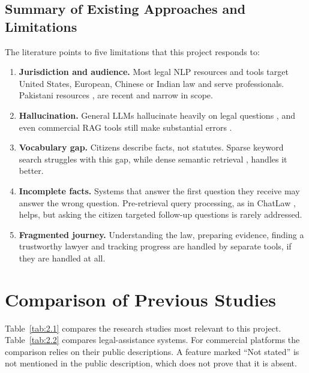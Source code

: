 \subsection{Summary of Existing Approaches and Limitations}

The literature points to five limitations that this project responds to:

\begin{enumerate}
  \item \textbf{Jurisdiction and audience.} Most legal NLP resources and tools target United States, European, Chinese or Indian law and serve professionals. Pakistani resources \cite{r18}, \cite{r19} are recent and narrow in scope.
  \item \textbf{Hallucination.} General LLMs hallucinate heavily on legal questions \cite{r8}, and even commercial RAG tools still make substantial errors \cite{r9}.
  \item \textbf{Vocabulary gap.} Citizens describe facts, not statutes. Sparse keyword search struggles with this gap, while dense semantic retrieval \cite{r12}, \cite{r13} handles it better.
  \item \textbf{Incomplete facts.} Systems that answer the first question they receive may answer the wrong question. Pre-retrieval query processing, as in ChatLaw \cite{r17}, helps, but asking the citizen targeted follow-up questions is rarely addressed.
  \item \textbf{Fragmented journey.} Understanding the law, preparing evidence, finding a trustworthy lawyer and tracking progress are handled by separate tools, if they are handled at all.
\end{enumerate}

\section{Comparison of Previous Studies}

Table~\ref{tab:2.1} compares the research studies most relevant to this project. Table~\ref{tab:2.2} compares legal-assistance systems. For commercial platforms the comparison relies on their public descriptions. A feature marked ``Not stated'' is not mentioned in the public description, which does not prove that it is absent.

